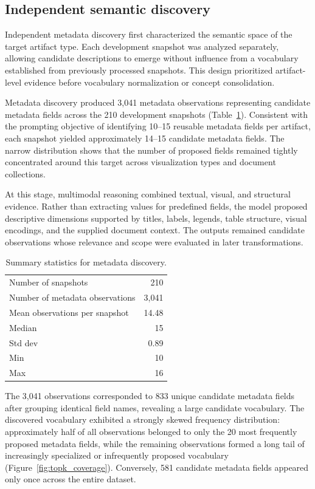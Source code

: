 \documentclass{article}
\begin{document}
\subsection{Independent semantic discovery}

Independent metadata discovery first characterized the semantic space of the target artifact type. Each development snapshot was analyzed separately, allowing candidate descriptions to emerge without influence from a vocabulary established from previously processed snapshots. This design prioritized artifact-level evidence before vocabulary normalization or concept consolidation.

Metadata discovery produced 3,041 metadata observations representing candidate metadata fields across the 210 development snapshots (Table~\ref{tab:discovery_productivity}). Consistent with the prompting objective of identifying 10--15 reusable metadata fields per artifact, each snapshot yielded approximately 14--15 candidate metadata fields. The narrow distribution shows that the number of proposed fields remained tightly concentrated around this target across visualization types and document collections.

At this stage, multimodal reasoning combined textual, visual, and structural evidence. Rather than extracting values for predefined fields, the model proposed descriptive dimensions supported by titles, labels, legends, table structure, visual encodings, and the supplied document context. The outputs remained candidate observations whose relevance and scope were evaluated in later transformations.

\begin{table}[!ht]
    \centering
    \caption{Summary statistics for metadata discovery.}
    \label{tab:discovery_productivity}
    \begin{tabular}{lr}
        Number of snapshots & 210 \\
        Number of metadata observations & 3,041 \\
        Mean observations per snapshot & 14.48 \\
        \quad Median & 15 \\
        \quad Std dev & 0.89 \\
        \quad Min & 10 \\
        \quad Max & 16 \\
    \end{tabular}
\end{table}

The 3,041 observations corresponded to 833 unique candidate metadata fields after grouping identical field names, revealing a large candidate vocabulary. The discovered vocabulary exhibited a strongly skewed frequency distribution: approximately half of all observations belonged to only the 20 most frequently proposed metadata fields, while the remaining observations formed a long tail of increasingly specialized or infrequently proposed vocabulary (Figure~\ref{fig:topk_coverage}). Conversely, 581 candidate metadata fields appeared only once across the entire dataset.
\end{document}
